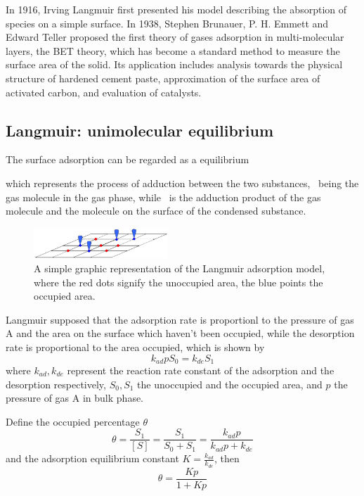 \documentclass[%
 reprint,
 amsmath,amssymb,
 aps,
10.5pt,
]{revtex4-1}
\begin{document}
In 1916, Irving Langmuir first presented his model describing the absorption of species on a simple surface\cite{langmuir1918adsorption}. In 1938, Stephen Brunauer, P. H. Emmett and Edward Teller proposed the first theory of gases adsorption in multi-molecular layers, the BET theory, which has become a standard method to measure the surface area of the solid\cite{brunauer1938adsorption}. Its application includes analysis towards the physical structure of hardened cement paste, approximation of the surface area of activated carbon, and evaluation of catalysts.

\subsection{Langmuir: unimolecular equilibrium}
The surface adsorption can be regarded as a equilibrium
\begin{center}
\end{center}
which represents the process of adduction between the two substances, ~being the gas molecule in the gas phase, while ~is the adduction product of the gas molecule and the molecule on the surface of the condensed substance.

\begin{figure}
\centering
\includegraphics[width=0.45\textwidth]{figures/Langmuir_Adsorption_Model.jpg}
\caption{A simple graphic representation of the Langmuir adsorption model, where the red dots signify the unoccupied area, the blue points the occupied area.}
\end{figure}

Langmuir supposed that the adsorption rate is proportionl to the pressure of gas A and the area on the surface which haven't been occupied, while the desorption rate is proportional to the area occupied, which is shown by
\begin{equation}
k_{ad} p S_0 = k_{de} S_1
\end{equation}
where $k_{ad},k_{de}$ represent the reaction rate constant of the adsorption and the desorption respectively, $S_0,S_1$ the unoccupied and the occupied area, and $p$ the pressure of gas A in bulk phase.

Define the occupied percentage $\theta$
\begin{equation}
\theta = \frac{S_1}{[S]} = \frac{S_1}{S_0+S_1} = \frac{k_{ad}p}{k_{ad}p+k_{de}}
\end{equation}
and the adsorption equilibrium constant $K=\frac{k_{ad}}{k_{de}}$, then
\begin{equation}
\theta = \frac{Kp}{1+Kp}
\end{equation}
\end{document}
